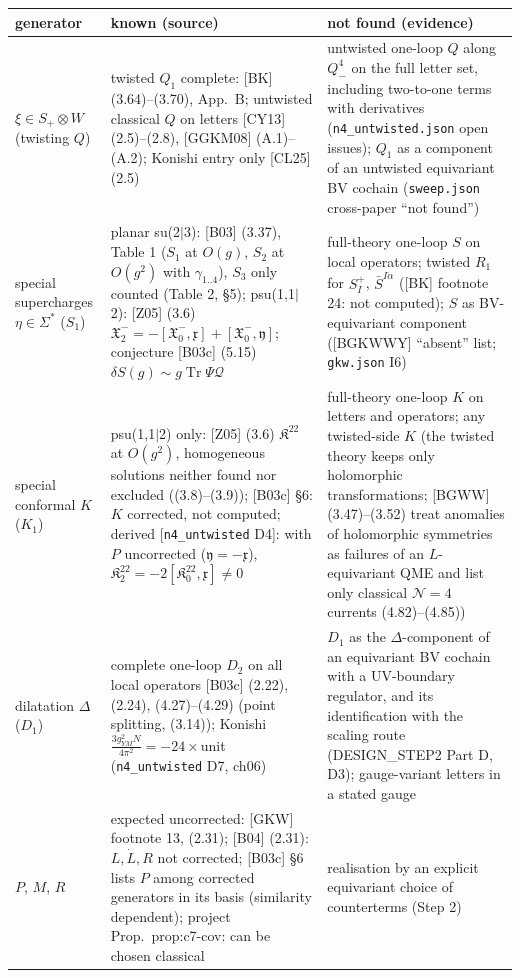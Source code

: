 \documentclass[11pt]{article}
\theoremstyle{definition}
\newcommand{\Tr}{\operatorname{Tr}}
\begin{document}
\begin{longtable}{p{2.6cm}p{6.6cm}p{6.6cm}}
\toprule
generator & known (source) & not found (evidence)\\
\midrule
$\xi\in S_+\otimes W$ (twisting $Q$) & twisted $Q_1$ complete: [BK] (3.64)--(3.70), App.~B; untwisted classical $Q$ on letters [CY13] (2.5)--(2.8), [GGKM08] (A.1)--(A.2); Konishi entry only [CL25] (2.5) & untwisted one-loop $Q$ along $Q^4_-$ on the full letter set, including two-to-one terms with derivatives (\texttt{n4\_untwisted.json} open issues); $Q_1$ as a component of an untwisted equivariant BV cochain (\texttt{sweep.json} cross-paper ``not found'')\\
special supercharges $\eta\in\Sigma^*$ ($S_1$) & planar su(2$|$3): [B03] (3.37), Table 1 ($S_1$ at $O(g)$, $S_2$ at $O(g^2)$ with $\gamma_{1..4}$), $S_3$ only counted (Table 2, \S5); psu(1,1$|$2): [Z05] (3.6) $\mathfrak X^-_2=-[\mathfrak X^-_0,\mathfrak x]+[\mathfrak X^-_0,\mathfrak y]$; conjecture [B03c] (5.15) $\delta S(g)\sim g\Tr\Psi\mathcal Q$ & full-theory one-loop $S$ on local operators; twisted $R_1$ for $S^+_I$, $\bar S^{I\dot\alpha}$ ([BK] footnote 24: not computed); $S$ as BV-equivariant component ([BGKWWY] ``absent'' list; \texttt{gkw.json} I6)\\
special conformal $K$ ($K_1$) & psu(1,1$|$2) only: [Z05] (3.6) $\mathfrak K^{22}$ at $O(g^2)$, homogeneous solutions neither found nor excluded ((3.8)--(3.9)); [B03c] \S6: $K$ corrected, not computed; derived [\texttt{n4\_untwisted} D4]: with $P$ uncorrected ($\mathfrak y=-\mathfrak x$), $\mathfrak K^{22}_2=-2[\mathfrak K^{22}_0,\mathfrak x]\neq0$ & full-theory one-loop $K$ on letters and operators; any twisted-side $K$ (the twisted theory keeps only holomorphic transformations; [BGWW] (3.47)--(3.52) treat anomalies of holomorphic symmetries as failures of an $L$-equivariant QME and list only classical $\mathcal N=4$ currents (4.82)--(4.85))\\
dilatation $\Delta$ ($D_1$) & complete one-loop $D_2$ on all local operators [B03c] (2.22), (2.24), (4.27)--(4.29) (point splitting, (3.14)); Konishi $\frac{3g_{YM}^2N}{4\pi^2}=-24\times$unit (\texttt{n4\_untwisted} D7, ch06) & $D_1$ as the $\Delta$-component of an equivariant BV cochain with a UV-boundary regulator, and its identification with the scaling route (DESIGN\_STEP2 Part D, D3); gauge-variant letters in a stated gauge\\
$P$, $M$, $R$ & expected uncorrected: [GKW] footnote 13, (2.31); [B04] (2.31): $L,\dot L,R$ not corrected; [B03c] \S6 lists $P$ among corrected generators in its basis (similarity dependent); project Prop.~prop:c7-cov: can be chosen classical & realisation by an explicit equivariant choice of counterterms (Step 2)\\

\end{longtable}
\end{document}
